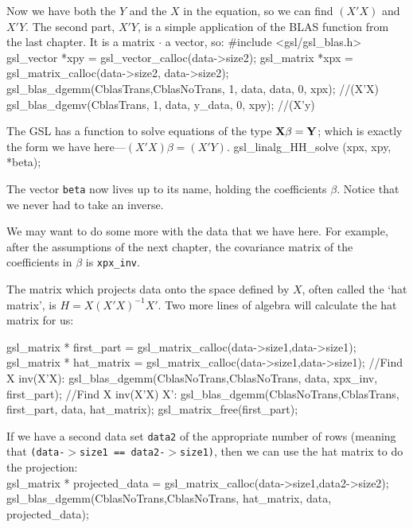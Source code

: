 Now we have both the $Y$ and the $X$ in the equation, so we can find $(X'X)$ and $X'Y$.
The second part, $X'Y$, is a simple application of the BLAS function from the last chapter. It is a
matrix $\cdot$ a vector, so:
#include <gsl/gsl_blas.h>
gsl_vector      *xpy            = gsl_vector_calloc(data->size2);
gsl_matrix      *xpx            = gsl_matrix_calloc(data->size2, data->size2);
        gsl_blas_dgemm(CblasTrans,CblasNoTrans, 1, data, data, 0, xpx); //(X'X)
        gsl_blas_dgemv(CblasTrans, 1, data, y_data, 0, xpy); //(X'y)

The GSL has a function to solve equations of the type ${\bf X} \beta =
{\bf Y}$; which is exactly the form we have here---$(X'X)\beta = (X'Y)$.  \label{ols}
        gsl_linalg_HH_solve (xpx, xpy, *beta);

The vector {\tt beta} now lives up to its name, holding the coefficients
$\beta$. Notice that we never had to take an inverse.  

We may want to do some more with the data that we have here. For example, after the assumptions of the
next chapter, the covariance matrix of the coefficients in $\beta$ is {\tt xpx\_inv}.

The matrix which projects data onto the space defined by $X$, often
called the `hat matrix', is $H = X(X'X)^{-1}X'$. Two more lines of algebra will calculate the hat matrix
for us:

gsl_matrix * first_part = gsl_matrix_calloc(data->size1,data->size1);
gsl_matrix * hat_matrix = gsl_matrix_calloc(data->size1,data->size1);
//Find X inv(X'X):
gsl_blas_dgemm(CblasNoTrans,CblasNoTrans, data, xpx_inv, first_part);	
//Find X inv(X'X) X':
gsl_blas_dgemm(CblasNoTrans,CblasTrans, first_part, data, hat_matrix);	
gsl_matrix_free(first_part);

If we have a second data set {\tt data2} of the appropriate number of
rows (meaning that {\tt (data-$>$size1 == data2-$>$size1)}, then we can use the hat matrix to do the projection:\\
gsl_matrix * projected_data = gsl_matrix_calloc(data->size1,data2->size2);
gsl_blas_dgemm(CblasNoTrans,CblasNoTrans, hat_matrix, data, projected_data);




